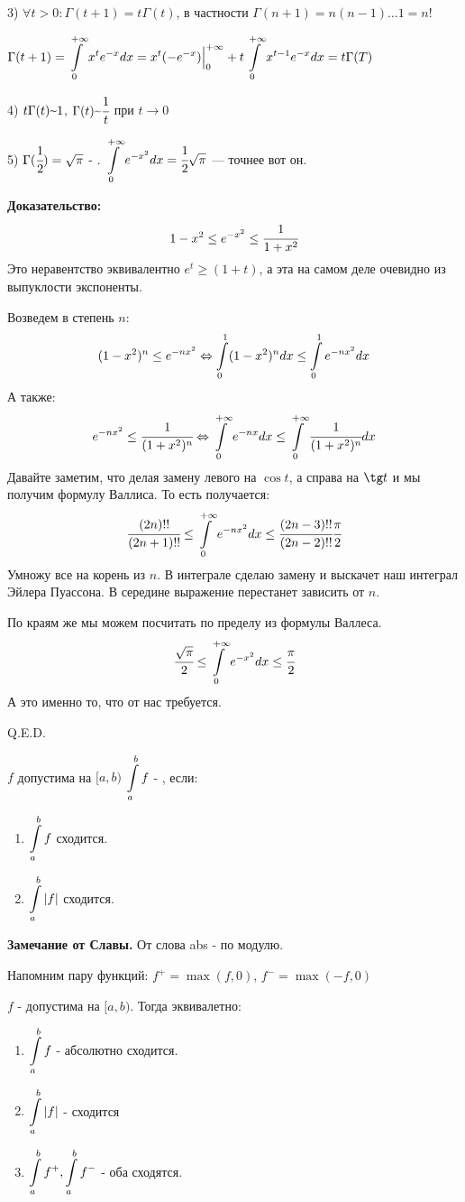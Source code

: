 3) $\forall t >0: \Gamma(t+1) = t \Gamma(t)$, в частности $\Gamma(n+1) = n (n-1) \ldots 1 = n!$

$\Gamma(t+1) = \displaystyle\int\limits_{0}^{+\infty}x^t e^{-x} dx = x^t (-e^{-x})\Big|^{+\infty}_{0} + t \displaystyle\int\limits_{0}^{+\infty}x^{t-1}e^{-x} dx= t\Gamma(T)$

4) $t \Gamma(t) \mytilde 1$, $\Gamma(t) \mytilde \cfrac{1}{t}$ при $t\rightarrow 0 $

5) $\Gamma(\cfrac{1}{2}) = \sqrt{\pi}$ - . $\displaystyle\int\limits_{0}^{+\infty}e^{-x^2}dx = \cfrac{1}{2}\sqrt{\pi}$ --- точнее вот он.

\textbf{Доказательство:}
$$1-x^2\leq e^{-x^2}\leq \cfrac{1}{1+x^2}$$
Это неравентство эквивалентно $e^t \geq (1+t)$, а эта на самом деле очевидно из выпуклости экспоненты.

Возведем в степень $n$:
$$(1-x^2)^n \leq e^{-nx^2} \Leftrightarrow \displaystyle\int\limits_{0}^{1}(1-x^2)^n dx \leq \displaystyle\int\limits_{0}^{1}e^{-nx^2}dx$$
А также:
$$e^{-nx^2} \leq \cfrac{1}{(1+x^2)^n} \Leftrightarrow \displaystyle\int\limits_{0}^{+\infty}e^{-nx}dx\leq \displaystyle\int\limits_{0}^{+\infty}\cfrac{1}{(1+x^2)^n}dx$$
Давайте заметим, что  делая замену левого на $\cos t$, а справа на $\tg t$ и мы получим формулу Валлиса. То есть получается:
$$\cfrac{(2n)!!}{(2n+1)!!}\leq \displaystyle\int\limits_{0}^{+\infty} e^{-nx^2}dx \leq \cfrac{(2n-3)!!}{(2n-2)!!}\cfrac{\pi}{2}$$
Умножу все на корень из $n$. В интеграле сделаю замену и выскачет наш интеграл Эйлера Пуассона. В середине выражение перестанет зависить от $n$.

По краям же мы можем посчитать по пределу из формулы Валлеса. 
$$\cfrac{\sqrt{\pi}}{2} \leq \displaystyle\int\limits_{0}^{+\infty}e^{-x^2}dx \leq \cfrac{\pi}{2}$$
А это именно то, что от нас требуется.

\hfill Q.E.D.

 $f$ допустима на $[a,b)$
$\displaystyle\int\limits_{a}^{b}f$ - , если:
\begin{enumerate}
    \item $\displaystyle\int\limits_{a}^{b}f$ сходится.
    \item $\displaystyle\int\limits_{a}^{b} |f|$ сходится.
\end{enumerate}

\textbf{Замечание от Славы.} От слова abs - по модулю.

Напомним пару функций: $f^+ =\max (f,0)$, $f^{-} = \max(-f,0)$


$f$ - допустима на $[a,b)$. Тогда эквивалетно:

\begin{enumerate}
    \item $\displaystyle\int\limits_{a}^{b}f$ - абсолютно сходится.
    \item $\displaystyle\int\limits_{a}^{b}|f|$ - сходится
    \item $\displaystyle\int\limits_{a}^{b} f^+, \displaystyle\int\limits_{a}^{b} f^{-}$ - оба сходятся.
\end{enumerate}

